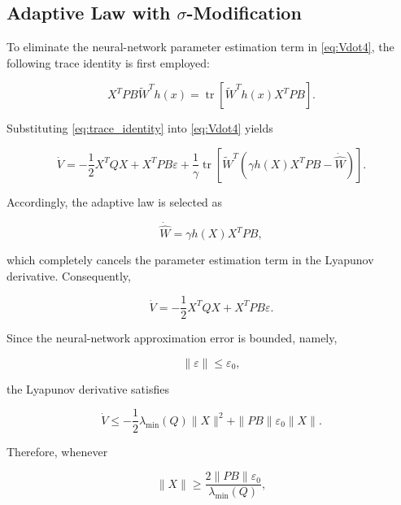 \subsection{Adaptive Law with $\sigma$-Modification}

To eliminate the neural-network parameter estimation term in \eqref{eq:Vdot4}, the following trace identity is first employed:

\begin{equation}
	X^{T}PB\tilde{W}^{T}h(x)
	=
	\operatorname{tr}
	\left[
	\tilde{W}^{T}
	h(x)
	X^{T}PB
	\right].
	\label{eq:trace_identity}
\end{equation}

Substituting \eqref{eq:trace_identity} into \eqref{eq:Vdot4} yields

\begin{equation}
	\dot{V}
	=
	-\frac{1}{2}
	X^{T}QX
	+
	X^{T}PB\varepsilon
	+
	\frac{1}{\gamma}
	\operatorname{tr}
	\left[
	\tilde{W}^{T}
	\left(
	\gamma
	h(X)
	X^{T}PB
	-
	\dot{\hat{W}}
	\right)
	\right].
	\label{eq:adaptive1}
\end{equation}

Accordingly, the adaptive law is selected as

\begin{equation}
	\dot{\hat{W}}
	=
	\gamma
	h(X)
	X^{T}
	PB,
	\label{eq:adaptive2}
\end{equation}

which completely cancels the parameter estimation term in the Lyapunov derivative. Consequently,

\begin{equation}
	\dot{V}
	=
	-\frac{1}{2}
	X^{T}QX
	+
	X^{T}PB\varepsilon.
	\label{eq:adaptive3}
\end{equation}

Since the neural-network approximation error is bounded, namely,

\begin{equation}
	\|\varepsilon\|
	\le
	\varepsilon_{0},
\end{equation}

the Lyapunov derivative satisfies

\begin{equation}
	\dot{V}
	\le
	-
	\frac{1}{2}
	\lambda_{\min}(Q)
	\|X\|^{2}
	+
	\|PB\|
	\varepsilon_{0}
	\|X\|.
	\label{eq:adaptive4}
\end{equation}

Therefore, whenever

\begin{equation}
	\|X\|
	\ge
	\frac
	{2\|PB\|\varepsilon_{0}}
	{\lambda_{\min}(Q)},
	\label{eq:adaptive5}
\end{equation}

